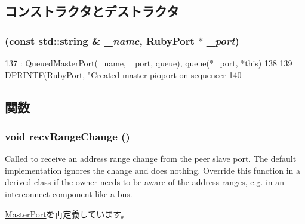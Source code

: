 \subsection{コンストラクタとデストラクタ}
\hypertarget{classRubyPort_1_1PioMasterPort_a53288266e38c91f9aecf50832e5d70fc}{
\subsubsection[{PioMasterPort}]{ (const std::string \& {\em \_\-name}, \/  {\bf RubyPort} $\ast$ {\em \_\-port})}}
\label{classRubyPort_1_1PioMasterPort_a53288266e38c91f9aecf50832e5d70fc}



\begin{DoxyCode}
137     : QueuedMasterPort(_name, _port, queue), queue(*_port, *this)
138 {
139     DPRINTF(RubyPort, "Created master pioport on sequencer %
140 }
\end{DoxyCode}


\subsection{関数}
\hypertarget{classRubyPort_1_1PioMasterPort_aecf310a01b533ae8700eccac2cf20480}{
\subsubsection[{recvRangeChange}]{\setlength{\rightskip}{0pt plus 5cm}void recvRangeChange ()}}
\label{classRubyPort_1_1PioMasterPort_aecf310a01b533ae8700eccac2cf20480}
Called to receive an address range change from the peer slave port. The default implementation ignores the change and does nothing. Override this function in a derived class if the owner needs to be aware of the address ranges, e.g. in an interconnect component like a bus. 

\hyperlink{classMasterPort_af60d9c2c17fb4c9ebc5384a7e0c9f289}{MasterPort}を再定義しています。


